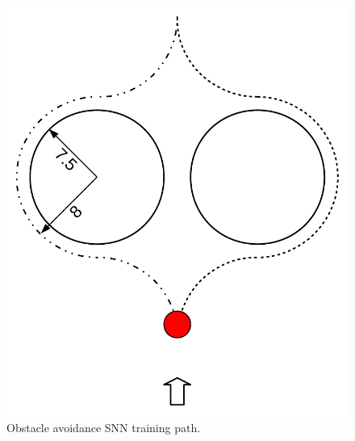 \begin{frame}
\begin{columns}
\begin{overprint}
\begin{figure}
					\includegraphics[height=0.6\textheight]{img/oa_training_path.pdf}
					\caption{Obstacle avoidance SNN training path.}
					\label{fig:oa_training_path}
				\end{figure}
			\end{overprint}
	\end{columns}
\end{frame}

